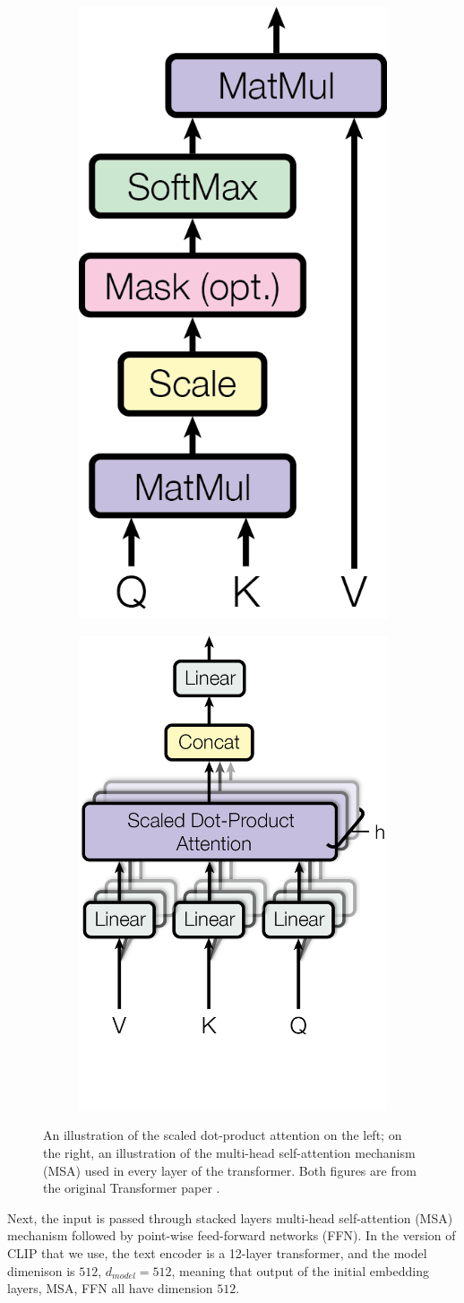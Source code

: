 \begin{figure}[!htb]
\begin{subfigure}{0.5\textwidth}
\centering
\includegraphics[width=.3\linewidth]{modeling/selfAttention.png}  
\end{subfigure}
\begin{subfigure}{0.5\textwidth}
\centering
\includegraphics[width=.5\linewidth]{modeling/multiHeadAttention.png}  
\end{subfigure}
\caption{An illustration of the scaled dot-product attention on the left; on the right, an illustration of the multi-head self-attention mechanism (MSA) used in every layer of the transformer. Both figures are from the original Transformer paper \citep{attentionAllYouNeed}.}
\label{modeling.attention}
\end{figure}

Next, the input is passed through stacked layers multi-head self-attention (MSA) mechanism followed by point-wise feed-forward networks (FFN). 
In the version of CLIP that we use, the text encoder is a 12-layer transformer, and the model dimenison is $512$, $d_{model} = 512$, meaning that output of the initial embedding layers, MSA, FFN all have dimension $512$.  


